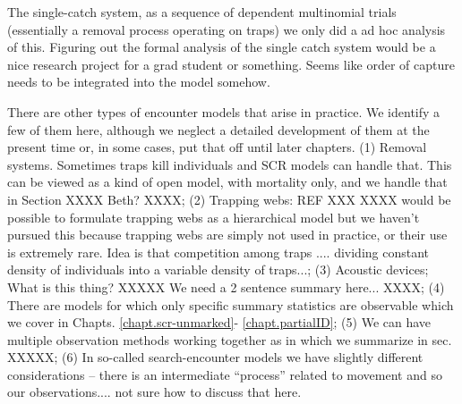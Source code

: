 The single-catch system, as a sequence of dependent multinomial trials
(essentially a removal process operating on traps) we only did a ad
hoc analysis of this. 
Figuring out the formal analysis of the single catch system would be
a nice research project for a grad student or something. 
Seems like order of capture needs to be integrated into the model somehow.
 
There are other types of encounter models that arise in
practice. We identify a few of them here, although we neglect a
detailed development of them at the present time or, in some cases, put that off until
later chapters.
(1) Removal systems. Sometimes traps kill individuals and SCR models can handle
that. This can be viewed as a kind of open model, with mortality only, and we handle that
in Section XXXX Beth? XXXX;
(2) Trapping webs: REF XXX XXXX 
would be possible to formulate trapping webs as a hierarchical model
but we haven't pursued this because trapping webs are simply not used
in practice, or their use is extremely rare.  Idea is that competition
among traps .... dividing constant density of individuals into a
variable density of traps...;
(3) Acoustic devices; What is this thing? XXXXX We need a 2 sentence
summary here... XXXX;
(4) 
There are models for which
only specific summary statistics are observable
\citep{chandler_royle:2012}
which we cover in Chapts. \ref{chapt.scr-unmarked}-
\ref{chapt.partialID};
(5) We can have multiple observation methods working together as in
\citet{gopalaswamy_etal:2012} which we summarize in sec. XXXXX;
(6) In so-called search-encounter models we have slightly different
considerations -- there is an intermediate ``process'' related to
movement and so our observations.... not sure how to discuss that here.



